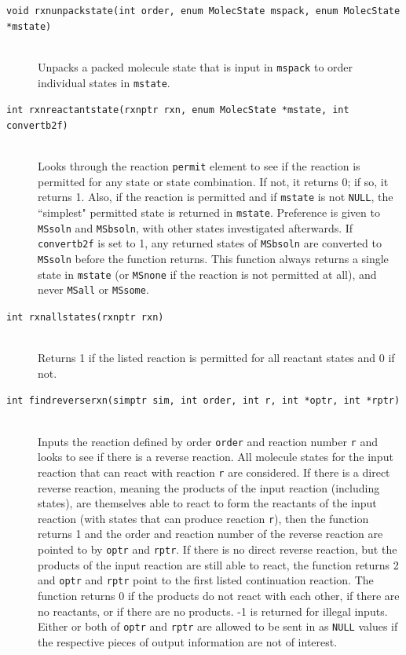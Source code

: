 \documentclass {scrbook}
\newcommand {\ttt} {\texttt}
\begin{document}
\begin{description}
\item[\ttt{void rxnunpackstate(int order, enum MolecState mspack, enum MolecState *mstate)}]
\hfill \\
Unpacks a packed molecule state that is input in \ttt{mspack} to order individual states in \ttt{mstate}.

\item[\ttt{int rxnreactantstate(rxnptr rxn, enum MolecState *mstate, int convertb2f)}]
\hfill \\
Looks through the reaction \ttt{permit} element to see if the reaction is permitted for any state or state combination. If not, it returns 0; if so, it returns 1. Also, if the reaction is permitted and if \ttt{mstate} is not \ttt{NULL}, the ``simplest" permitted state is returned in \ttt{mstate}. Preference is given to \ttt{MSsoln} and \ttt{MSbsoln}, with other states investigated afterwards. If \ttt{convertb2f} is set to 1, any returned states of \ttt{MSbsoln} are converted to \ttt{MSsoln} before the function returns. This function always returns a single state in \ttt{mstate} (or \ttt{MSnone} if the reaction is not permitted at all), and never \ttt{MSall} or \ttt{MSsome}.

\item[\ttt{int rxnallstates(rxnptr rxn)}]
\hfill \\
Returns 1 if the listed reaction is permitted for all reactant states and 0 if not.

\item[\ttt{int findreverserxn(simptr sim, int order, int r, int *optr, int *rptr)}]
\hfill \\
Inputs the reaction defined by order \ttt{order} and reaction number \ttt{r} and looks to see if there is a reverse reaction. All molecule states for the input reaction that can react with reaction \ttt{r} are considered. If there is a direct reverse reaction, meaning the products of the input reaction (including states), are themselves able to react to form the reactants of the input reaction (with states that can produce reaction \ttt{r}), then the function returns 1 and the order and reaction number of the reverse reaction are pointed to by \ttt{optr} and \ttt{rptr}. If there is no direct reverse reaction, but the products of the input reaction are still able to react, the function returns 2 and \ttt{optr} and \ttt{rptr} point to the first listed continuation reaction. The function returns 0 if the products do not react with each other, if there are no reactants, or if there are no products. -1 is returned for illegal inputs. Either or both of \ttt{optr} and \ttt{rptr} are allowed to be sent in as \ttt{NULL} values if the respective pieces of output information are not of interest.


\end{description}
\end{document}
